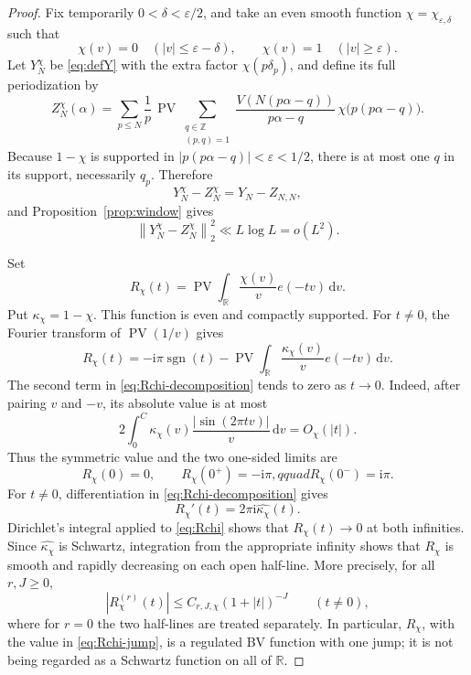 \documentclass[11pt]{article}
\numberwithin{equation}{section}
\theoremstyle{definition}
\newcommand{\R}{\mathbb R}
\newcommand{\Z}{\mathbb Z}
\newcommand{\1}{\mathbf 1}
\newcommand{\ii}{\mathrm i}
\newcommand{\dd}{\,\mathrm d}
\newcommand{\PV}{\operatorname{PV}}
\newcommand{\sgn}{\operatorname{sgn}}
\newcommand{\norm}[1]{\left\lVert#1\right\rVert}
\begin{document}
\begin{proof}
Fix temporarily \(0<\delta<\varepsilon/2\), and take an even smooth
function \(\chi=\chi_{\varepsilon,\delta}\) such that
\[
 \chi(v)=0\quad(|v|\le\varepsilon-\delta),\qquad
 \chi(v)=1\quad(|v|\ge\varepsilon).
\]
Let \(Y_N^\chi\) be \eqref{eq:defY} with the extra factor
\(\chi(p\delta_p)\), and define its full periodization by
\[
 Z_N^\chi(\alpha)=
 \sum_{p\le N}\frac1p\,
 \PV\sum_{\substack{q\in\Z\\(p,q)=1}}
 \frac{V(N(p\alpha-q))}{p\alpha-q}\,
 \chi\bigl(p(p\alpha-q)\bigr).
\]
Because \(1-\chi\) is supported in \(|p(p\alpha-q)|<\varepsilon<1/2\),
there is at most one \(q\) in its support, necessarily \(q_p\).
Therefore
\begin{equation}\label{eq:far-window}
 Y_N^\chi-Z_N^\chi=Y_N-Z_{N,N},
\end{equation}
and Proposition~\ref{prop:window} gives
\begin{equation}\label{eq:far-window-L2}
 \norm{Y_N^\chi-Z_N^\chi}_2^2\ll L\log L=o(L^2).
\end{equation}

Set
\begin{equation}\label{eq:Rchi}
 R_\chi(t)=\PV\int_{\R}\frac{\chi(v)}v e(-tv)\dd v.
\end{equation}
Put \(\kappa_\chi=1-\chi\).  This function is even and compactly
supported.  For \(t\ne0\), the Fourier transform of
\(\PV(1/v)\) gives
\begin{equation}\label{eq:Rchi-decomposition}
 R_\chi(t)=-\ii\pi\sgn(t)-
 \PV\int_{\R}\frac{\kappa_\chi(v)}v e(-tv)\dd v.
\end{equation}
The second term in \eqref{eq:Rchi-decomposition} tends to zero as
\(t\to0\).  Indeed, after pairing \(v\) and \(-v\), its absolute
value is at most
\[
 2\int_0^C\kappa_\chi(v)
 \frac{|\sin(2\pi tv)|}{v}\dd v=O_\chi(|t|).
\]
Thus the symmetric value and the two one-sided limits are
\begin{equation}\label{eq:Rchi-jump}
 R_\chi(0)=0,\qquad
 R_\chi(0^+)=-\ii\pi,qquad R_\chi(0^-)=\ii\pi.
\end{equation}
For \(t\ne0\), differentiation in
\eqref{eq:Rchi-decomposition} gives
\[
 R_\chi'(t)=2\pi\ii\widehat{\kappa_\chi}(t).
\]
Dirichlet's integral applied to \eqref{eq:Rchi} shows that
\(R_\chi(t)\to0\) at both infinities.  Since
\(\widehat{\kappa_\chi}\) is Schwartz, integration from the
appropriate infinity shows that \(R_\chi\) is smooth and rapidly
decreasing on each open half-line.  More precisely, for all
\(r,J\ge0\),
\begin{equation}\label{eq:Rchi-Schwartz}
 |R_\chi^{(r)}(t)|
 \le C_{r,J,\chi}(1+|t|)^{-J}\qquad(t\ne0),
\end{equation}
where for \(r=0\) the two half-lines are treated separately.  In
particular, \(R_\chi\), with the value in \eqref{eq:Rchi-jump}, is a
regulated BV function with one jump; it is not being regarded as a
Schwartz function on all of \(\R\).


\end{proof}
\end{document}
